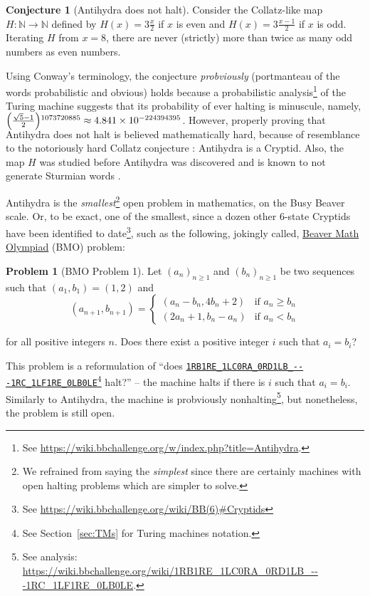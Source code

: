 \documentclass[a4paper,british]{article}
\theoremstyle{definition} %
\newtheorem{conjecture}{Conjecture}[section]
\newtheorem{problem}{Problem}[section]
\numberwithin{equation}{section}
\theoremstyle{definition} %
\newcommand{\tm}[1]{\href{https://bbchallenge.org/#1}{\texttt{\nolinkurl{#1}}}}
\begin{document}
\begin{conjecture}[Antihydra does not halt]
    Consider the Collatz-like map $H: \mathbb{N} \to \mathbb{N}$ defined by $H(x) = 3\frac{x}{2}$ if $x$ is even and $H(x) = 3\frac{x-1}{2}$ if $x$ is odd. Iterating $H$ from $x=8$, there are never (strictly) more than twice as many odd numbers as even numbers.
\end{conjecture}

Using Conway's terminology, the conjecture \textit{probviously} (portmanteau of the words probabilistic and obvious) holds because a probabilistic analysis\footnote{See \url{https://wiki.bbchallenge.org/w/index.php?title=Antihydra}.} of the Turing machine suggests that its probability of ever halting is minuscule, namely, $\smash{\left(\frac{\sqrt{5}-1}{2}\right)}^{1073720885}\approx 4.841\times 10^{-224394395}$. However, properly proving that Antihydra does not halt is believed mathematically hard, because of resemblance to the notoriously hard Collatz conjecture \cite{LagariasCollatz}: Antihydra is a Cryptid. Also, the map $H$ was studied before Antihydra was discovered and is known to not generate Sturmian words \cite{DUBICKAS_2009}.

Antihydra is the \textit{smallest}\footnote{We refrained from saying the \textit{simplest} since there are certainly machines with open halting problems which are simpler to solve.} open problem in mathematics, on the Busy Beaver scale. Or, to be exact, one of the smallest, since a dozen other 6-state Cryptids have been identified to date\footnote{See \url{https://wiki.bbchallenge.org/wiki/BB(6)\#Cryptids}}, such as the following, jokingly called, \href{https://wiki.bbchallenge.org/wiki/Beaver_Math_Olympiad}{Beaver Math Olympiad} (BMO) problem:

\begin{problem}[BMO Problem 1]
Let $(a_n)_{n \ge 1}$ and $(b_n)_{n \ge 1}$ be two sequences such that $(a_1, b_1) = (1, 2)$ and
$$(a_{n+1}, b_{n+1}) = \begin{cases}
        (a_n-b_n, 4b_n+2) & \text{if }a_n \ge b_n \\
        (2a_n+1, b_n-a_n) & \text{if }a_n < b_n
    \end{cases}$$

\noindent for all positive integers $n$. Does there exist a positive integer $i$ such that $a_i = b_i$?
\end{problem}

This problem is a reformulation of  ``does \tm{1RB1RE_1LC0RA_0RD1LB_---1RC_1LF1RE_0LB0LE}\footnote{See Section~\ref{sec:TMs} for Turing machines notation.} halt?'' -- the machine halts if there is $i$ such that $a_i = b_i$. Similarly to Antihydra, the machine is probviously nonhalting\footnote{See analysis: {\scriptsize \url{https://wiki.bbchallenge.org/wiki/1RB1RE_1LC0RA_0RD1LB_---1RC_1LF1RE_0LB0LE}}. }, but nonetheless, the problem is still open.
\end{document}
